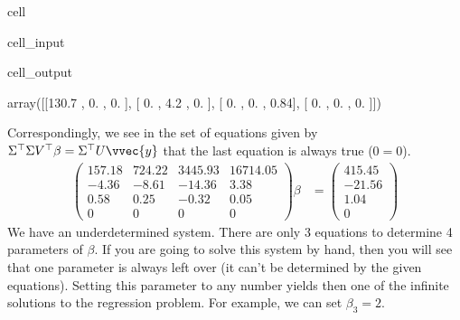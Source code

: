 \documentclass[letterpaper,10pt,english]{jupyterBook}
\begin{document}
\begin{sphinxuseclass}{cell}\begin{sphinxVerbatimInput}

\begin{sphinxuseclass}{cell_input}
\begin{sphinxVerbatim}[commandchars=\\\{\}]
  
\end{sphinxVerbatim}

\end{sphinxuseclass}\end{sphinxVerbatimInput}
\begin{sphinxVerbatimOutput}

\begin{sphinxuseclass}{cell_output}
\begin{sphinxVerbatim}[commandchars=\\\{\}]
array([[130.7 ,   0.  ,   0.  ],
       [  0.  ,   4.2 ,   0.  ],
       [  0.  ,   0.  ,   0.84],
       [  0.  ,   0.  ,   0.  ]])
\end{sphinxVerbatim}

\end{sphinxuseclass}\end{sphinxVerbatimOutput}

\end{sphinxuseclass}
\sphinxAtStartPar
Correspondingly, we see in the set of equations given by \(\Sigma^\top \Sigma V^\top \beta = \Sigma^\top U \vvec{y}\) that the last equation is always true (\(0=0\)).
\begin{align*}
\begin{pmatrix}
 157.18 &   724.22 &  3445.93 & 16714.05\\
 -4.36  &  -8.61  & -14.36   &  3.38\\
 0.58   & 0.25   & -0.32    & 0.05\\
 0      & 0      & 0        & 0
\end{pmatrix}
\beta &= 
\begin{pmatrix}
415.45 \\ -21.56 \\ 1.04 \\   0
\end{pmatrix}
\end{align*}
\sphinxAtStartPar
We have an underdetermined system. There are only 3 equations to determine 4 parameters of \(\beta\). If you are going to solve this system by hand, then you will see that one parameter is always left over (it can’t be determined by the given equations). Setting this parameter to any number yields then one of the infinite solutions to the regression problem. For example, we can set \(\beta_3=2\).
\end{document}
